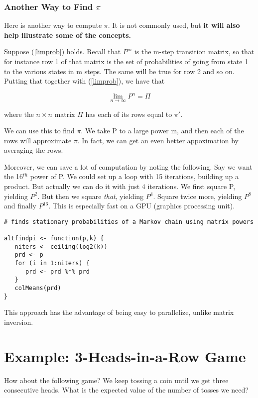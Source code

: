 \subsubsection{Another Way to Find $\pi$}

Here is another way to compute $\pi$.  It is not commonly used, but {\bf
it will also help illustrate some of the concepts.}  

Suppose (\ref{limprob}) holds.  Recall that $P^m$ is the m-step
transition matrix, so that for instance row 1 of that matrix is the set
of probabilities of going from state 1 to the various states in m steps.
The same will be true for row 2 and so on.  Putting that together with
(\ref{limprob}), we have that 

\begin{equation}
\lim_{n \rightarrow \infty} P^n = \Pi
\end{equation}

where the $n \times n$ matrix $\Pi$ has each of its rows equal to
$\pi'$. 

We can use this to find $\pi$.  We take P to a large power m, and then
each of the rows will approximate $\pi$.  In fact, we can get an even
better appoximation by averaging the rows.

Moreover, we can save a lot of computation by noting the following.  Say
we want the 16$^{th}$ power of P.  We could set up a loop with 15
iterations, building up a product.  But actually we can do it with just
4 iterations.  We first square P, yielding $P^2$.  But then we square
{\it that}, yielding $P^4$.  Square twice more, yielding $P^8$ and
finally $P^{16}$.  This is especially fast on a GPU (graphics processing
unit).

\begin{lstlisting}
# finds stationary probabilities of a Markov chain using matrix powers

altfindpi <- function(p,k) {
   niters <- ceiling(log2(k))
   prd <- p
   for (i in 1:niters) {
      prd <- prd %*% prd
   }
   colMeans(prd) 
}
\end{lstlisting}

This approach has the advantage of being easy to parallelize, unlike
matrix inversion.

\section{Example:  3-Heads-in-a-Row Game}
\label{threeinrow}

How about the following game?  We keep tossing a coin until we get three
consecutive heads.  What is the expected value of the number of tosses
we need?

